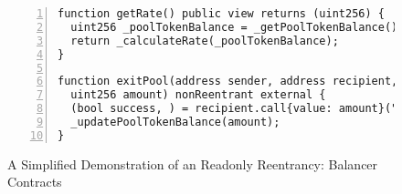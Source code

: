 \begin{figure}[t]
\begin{lstlisting}[numbers=left,stepnumber=1,xleftmargin=1em,numberstyle=\ttfamily\color{gray},numbersep=3pt]
function getRate() public view returns (uint256) {
  uint256 _poolTokenBalance = _getPoolTokenBalance(); // not uptated
  return _calculateRate(_poolTokenBalance);
}

function exitPool(address sender, address recipient, 
  uint256 amount) nonReentrant external {
  (bool success, ) = recipient.call{value: amount}(""); // reentrancy
  _updatePoolTokenBalance(amount);
}
\end{lstlisting}

\caption{A Simplified Demonstration of an Readonly Reentrancy: Balancer Contracts}
\label{fig:sturbyHack}
\end{figure}
